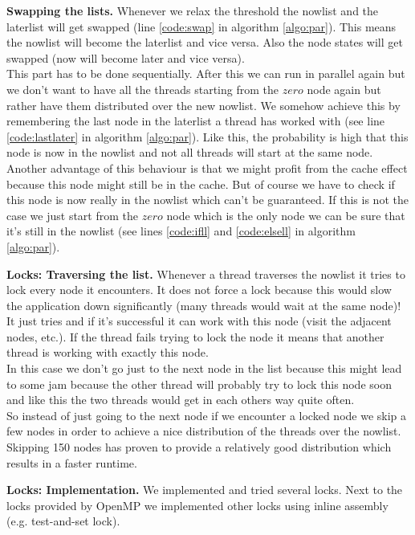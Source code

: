 \documentclass[letterpaper]{article}
\newcommand{\mypar}[1]{{\bf #1.}}
\begin{document}
\mypar{Swapping the lists}
Whenever we relax the threshold the nowlist and the laterlist will get swapped (line \ref{code:swap} in algorithm \ref{algo:par}). This means the nowlist will become the laterlist and vice versa. Also the node states will get swapped (now will become later and vice versa).\\
This part has to be done sequentially. After this we can run in parallel again but we don't want to have all the threads starting from the $zero$ node again but rather have them distributed over the new nowlist. We somehow achieve this by remembering the last node in the laterlist a thread has worked with (see line \ref{code:lastlater} in algorithm \ref{algo:par}). Like this, the probability is high that this node is now in the nowlist and not all threads will start at the same node. Another advantage of this behaviour is that we might profit from the cache effect because this node might still be in the cache. But of course we have to check if this node is now really in the nowlist which can't be guaranteed. If this is not the case we just start from the $zero$ node which is the only node we can be sure that it's still in the nowlist (see lines \ref{code:ifll} and \ref{code:elsell} in algorithm \ref{algo:par}).

\mypar{Locks: Traversing the list}
Whenever a thread traverses the nowlist it tries to lock every node it encounters. It does not force a lock because this would slow the application down significantly (many threads would wait at the same node)! It just tries and if it's successful it can work with this node (visit the adjacent nodes, etc.). If the thread fails trying to lock the node it means that another thread is working with exactly this node.\\
In this case we don't go just to the next node in the list because this might lead to some jam because the other thread will probably try to lock this node soon and like this the two threads would get in each others way quite often.\\
So instead of just going to the next node if we encounter a locked node we skip a few nodes in order to achieve a nice distribution of the threads over the nowlist. Skipping 150 nodes has proven to provide a relatively good distribution which results in a faster runtime.

\mypar{Locks: Implementation}
We implemented and tried several locks. Next to the locks provided by OpenMP we implemented other locks using inline assembly (e.g. test-and-set lock). 
\end{document}
